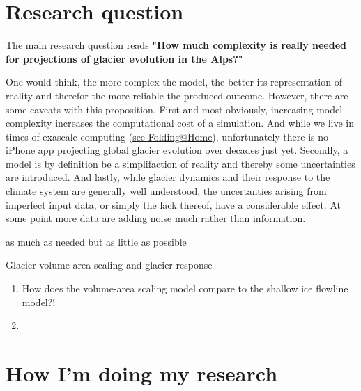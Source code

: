 \documentclass[12pt, a4paper, abstract=off, oneside]{scrartcl}
\begin{document}

    \section{Research question} %
    \label{sec:research_question}

            The main research question reads \textbf{"How much complexity is really needed for projections of glacier evolution in the Alps?"}

            One would think, the more complex the model, the better its representation of reality and therefor the more reliable the produced outcome. However, there are some caveats with this proposition. First and most obviously, increasing model complexity increases the computational cost of a simulation. And while we live in times of exascale computing (\href{https://stats.foldingathome.org/os}{see Folding@Home}), unfortunately there is no iPhone app projecting global glacier evolution over decades just yet. Secondly, a model is by definition be a simplifaction of reality and thereby some uncertainties are introduced. And lastly, while glacier dynamics and their response to the climate system are generally well understood, the uncertanties arising from imperfect input data, or simply the lack thereof, have a considerable effect. At some point more data are adding noise much rather than information.
            
            as much as needed but as little as possible

            Glacier volume-area scaling and glacier response 

            \begin{enumerate}
                \item How does the volume-area scaling model compare to the shallow ice flowline model?!
                \item 
            \end{enumerate}

    

    \section{How I'm doing my research} %
    \label{sec:how_i_m_doing_my_research}

\end{document}
